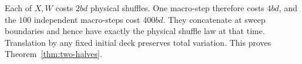 Each of $X,W$ costs $2bd$ physical shuffles. One macro-step therefore costs $4bd$, and the $100$ independent macro-steps cost $400bd$. They concatenate at sweep boundaries and hence have exactly the physical shuffle law at that time. Translation by any fixed initial deck preserves total variation. This proves Theorem~\ref{thm:two-halves}.
